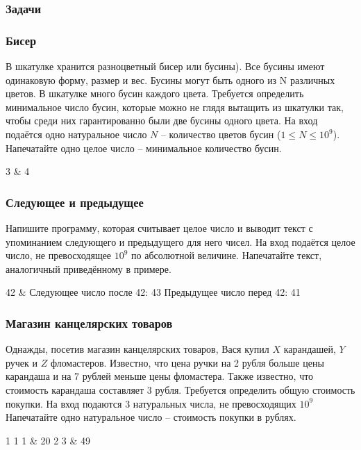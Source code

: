 \begin{frame}
	\frametitle{Задачи}
\end{frame}

\begin{frame}
	\frametitle{Бисер}
	В шкатулке хранится разноцветный бисер или бусины). Все бусины имеют
	одинаковую форму, размер и вес. Бусины могут быть одного из N различных
	цветов. В шкатулке много бусин каждого цвета.  Требуется определить
	минимальное число бусин, которые можно не глядя вытащить из шкатулки так,
	чтобы среди них гарантированно были две бусины одного цвета.
	\inp
	На вход подаётся одно натуральное число $N$ -- количество цветов бусин ($1 \leq N \leq 10^9$).
	\out
	Напечатайте одно целое число -- минимальное количество бусин.
	\begin{ex}
	3 & 4 \tb
	\end{ex}
\end{frame}

\begin{frame}
	\frametitle{Следующее и предыдущее}
	Напишите программу, которая считывает целое число и выводит текст с
	упоминанием следующего и предыдущего для него чисел.
	\inp
	На вход подаётся целое число, не превосходящее $10^9$ по абсолютной величине.
	\out
	Напечатайте текст, аналогичный приведённому в примере.
	\begin{ex}
	42 & Следующее число после 42: 43 \newline Предыдущее число перед 42: 41 \tb
	\end{ex}
\end{frame}

\begin{frame}
	\frametitle{Магазин канцелярских товаров}
	Однажды, посетив магазин канцелярских товаров, Вася купил $X$ карандашей, $Y$ ручек
	и $Z$ фломастеров. Известно, что цена ручки на 2 рубля больше цены карандаша и
	на 7 рублей меньше цены фломастера. Также известно, что стоимость карандаша
	составляет 3 рубля. Требуется определить общую стоимость покупки.
	\inp
	На вход подаются 3 натуральных числа, не превосходящих $10^9$
	\out
	Напечатайте одно натуральное число -- стоимость покупки в рублях.
	\begin{ex}
	1 1 1 & 20  2 3 & 49 \tb
	\end{ex}
\end{frame}

